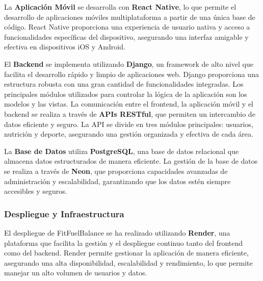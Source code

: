     La \textbf{Aplicación Móvil} se desarrolla con \textbf{React Native}, lo que permite el desarrollo de aplicaciones móviles multiplataforma a partir de una única base de código. React Native proporciona una experiencia de usuario nativa y acceso a funcionalidades específicas del dispositivo, asegurando una interfaz amigable y efectiva en dispositivos iOS y Android.
    
    El \textbf{Backend} se implementa utilizando \textbf{Django}, un framework de alto nivel que facilita el desarrollo rápido y limpio de aplicaciones web. Django proporciona una estructura robusta con una gran cantidad de funcionalidades integradas. Los principales módulos utilizados para controlar la lógica de la aplicación son los modelos y las vistas. La comunicación entre el frontend, la aplicación móvil y el backend se realiza a través de \textbf{APIs RESTful}, que permiten un intercambio de datos eficiente y seguro. La API se divide en tres módulos principales: usuarios, nutrición y deporte, asegurando una gestión organizada y efectiva de cada área.
    
    La \textbf{Base de Datos} utiliza \textbf{PostgreSQL}, una base de datos relacional que almacena datos estructurados de manera eficiente. La gestión de la base de datos se realiza a través de \textbf{Neon}, que proporciona capacidades avanzadas de administración y escalabilidad, garantizando que los datos estén siempre accesibles y seguros.
    

\subsubsection{Despliegue y Infraestructura}

El despliegue de FitFuelBalance se ha realizado utilizando \textbf{Render}, una plataforma que facilita la gestión y el despliegue continuo tanto del frontend como del backend. Render permite gestionar la aplicación de manera eficiente, asegurando una alta disponibilidad, escalabilidad y rendimiento, lo que permite manejar un alto volumen de usuarios y datos.
